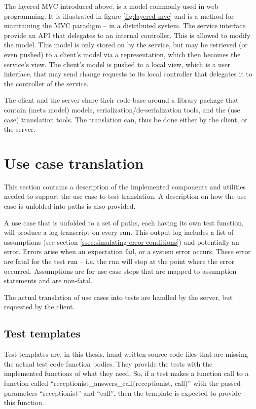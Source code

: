 \noindent The layered MVC introduced above, is a model commonly used in web programming. It is illustrated in figure \ref{fig:layered-mvc} and is a method for maintaining the MVC paradigm -- in a distributed system. The service interface provide an API that delegates to an internal controller. This is allowed to modify the model. This model is only stored on by the service, but may be retrieved (or even pushed) to a client's model via a representation, which then becomes the service's view. The client's model is pushed to a local view, which is a user interface, that may send change requests to its local controller that delegates it to the controller of the service.\medskip

\noindent The client and the server share their code-base around a library package that contain (meta model) models, serialization/de-serialization tools, and the (use case) translation tools. The translation can, thus be done either by the client, or the server.

\section{Use case translation}
This section contains a description of the implemented components and utilities needed to support the use case to test translation. A description on how the use case is unfolded into paths is also provided.\medskip

\noindent A use case that is unfolded to a set of paths, each having its own test function, will produce a log transcript on every run. This output log includes a list of assumptions (see section \ref{ssec:simulating-error-conditions}) and potentially an error. Errors arise when an expectation fail, or a system error occurs. These error are fatal for the test run -- i.e. the run will stop at the point where the error occurred. Assumptions are for use case steps that are mapped to assumption statements and are non-fatal.\medskip

\noindent The actual translation of use cases into tests are handled by the server, but requested by the client.

\subsection{Test templates}
Test templates are, in this thesis, hand-written source code files that are missing the actual test code function bodies. They provide the tests with the implemented functions of what they need. So, if a test makes a function call to a function called ``receptionist\_answers\_call(receptionist, call)'' with the passed parameters ``receptionist'' and ``call'', then the template is expected to provide this function.\medskip

